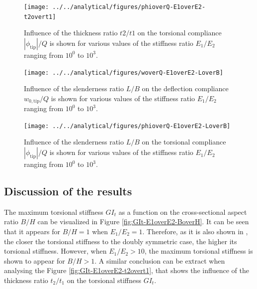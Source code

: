   \begin{figure}[!htpb] %
    \centering
    \texttt{[image: ../../analytical/figures/phioverQ-E1overE2-t2overt1]}
    \caption[Influence of the thickness ratio $t2/t1$ on the torsional compliance]{Influence of the thickness ratio $t2/t1$ on the torsional compliance $|\phi_{\mathrm{tip}}| / Q$ is shown for various values of the stiffness ratio $E_1/E_2$ ranging from $10^0$ to $10^3$. }\label{fig:phioverQ-E1overE2-t2overt1}
  \end{figure}

  \begin{figure}[!htpb] %
    \centering
    \texttt{[image: ../../analytical/figures/woverQ-E1overE2-LoverB]}
    \caption[Influence of the slenderness ratio $L/B$ on the deflection compliance]{Influence of the slenderness ratio $L/B$ on the deflection compliance $w_{\mathrm{0,tip}} / Q$ is shown for various values of the stiffness ratio $E_1/E_2$ ranging from $10^0$ to $10^3$. }\label{fig:woverQ-E1overE2-LoverB}
  \end{figure}

  \begin{figure}[!htpb] %
    \centering
    \texttt{[image: ../../analytical/figures/phioverQ-E1overE2-LoverB]}
    \caption[Influence of the slenderness ratio $L/B$ on the torsional compliance]{Influence of the slenderness ratio $L/B$ on the torsional compliance $|\phi_{\mathrm{tip}}| / Q$ is shown for various values of the stiffness ratio $E_1/E_2$ ranging from $10^0$ to $10^3$. }\label{fig:phioverQ-E1overE2-LoverB}
  \end{figure}

  \clearpage
  \subsection{Discussion of the results} \label{ubsec:disc_results_parametricStudy}

  The maximum torsional stiffness $G I_t$ as a function on the cross-sectional aspect ratio $B/H$ can be visualized in Figure \ref{fig:GIt-E1overE2-BoverH}. It can be seen that it appears for $B/H = 1$ when $E_1/E_2 = 1$. Therefore, as it is also shown in \cite{Raither2013a}, the closer the torsional stiffness to the doubly symmetric case, the higher its torsional stiffness. However, when $E_1/E_2 > 10$, the maximum torsional stiffness is shown to appear for $B/H > 1$. A similar conclusion can be extract when analysing the Figure \ref{fig:GIt-E1overE2-t2overt1}, that shows the influence of the thickness ratio $t_2/t_1$ on the torsional stiffness $G I_t$.

